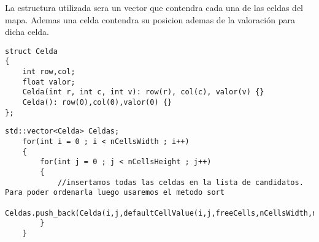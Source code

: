 La estructura utilizada sera un vector que contendra cada una de las celdas del mapa. Ademas una celda contendra su posicion ademas de la valoración para dicha celda.

\begin{lstlisting}[frame=single,basicstyle=\tiny,title={Estructura de Celda}]
struct Celda
{
	int row,col;
	float valor;
	Celda(int r, int c, int v): row(r), col(c), valor(v) {}
	Celda(): row(0),col(0),valor(0) {}
};
\end{lstlisting}

\begin{lstlisting}[frame=single,basicstyle=\tiny,title={Vector de Celdas}]
	std::vector<Celda> Celdas;
	for(int i = 0 ; i < nCellsWidth ; i++)
	{
		for(int j = 0 ; j < nCellsHeight ; j++)
		{
			//insertamos todas las celdas en la lista de candidatos. Para poder ordenarla luego usaremos el metodo sort
			Celdas.push_back(Celda(i,j,defaultCellValue(i,j,freeCells,nCellsWidth,nCellsHeight,mapWidth,mapHeight,obstacles,defenses)));
		}
	}
\end{lstlisting}
